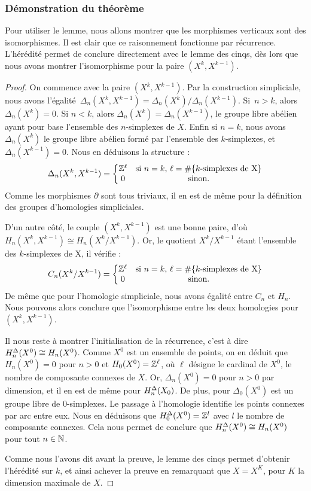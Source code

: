\subsubsection{Démonstration du théorème}
Pour utiliser le lemme, nous allons montrer que les morphismes verticaux sont des isomorphismes. Il est clair que ce raisonnement fonctionne par récurrence. L'hérédité permet de conclure directement avec le lemme des cinqs, dès lors que nous avons montrer l'isomorphisme pour la paire $(X^k, X^{k-1})$.
\begin{proof}
On commence avec la paire $(X^k, X^{k-1})$. Par la construction simpliciale, nous avons l'égalité~$\Delta_n(X^k,X^{k-1})=\Delta_n(X^k)/\Delta_n(X^{k-1})$. Si~$n>k$, alors $\Delta_n(X^k)=0$. Si $n<k$, alors $\Delta_n(X^k)=\Delta_n(X^{k-1})$, le groupe libre abélien ayant pour base l'ensemble des $n$-simplexes de $X$. Enfin si $n=k$, nous avons $\Delta_n(X^k)$ le groupe libre abélien formé par l'ensemble des $k$-simplexes, et $\Delta_n(X^{k-1})=0$. Nous en déduisons la structure : \[\Delta_n(X^k,X^{k-1})= \left\{\begin{matrix}
\mathbb{Z}^\ell & \text{si $n=k$, $\ell=\#\{k$-simplexes de X$\}$}\\
0 & \text{sinon}. \\
\end{matrix}\right.\]Comme les morphismes $\partial$ sont tous triviaux, il en est de même pour la définition des groupes d'homologies simpliciales.

D'un autre côté, le couple $(X^k,X^{k-1})$ est une bonne paire, d'où ${H_n(X^k,X^{k-1})\cong H_n(X^k/X^{k-1})}$. Or, le quotient $X^k/X^{k-1}$ étant l'ensemble des $k$-simplexes de X, il vérifie : \[C_n(X^k/X^{k-1})=\left\{\begin{matrix}
\mathbb{Z}^\ell & \text{si $n=k$, $\ell=\#\{k$-simplexes de X$\}$}\\
0&\text{sinon.}
\end{matrix}\right.\]De même que pour l'homologie simpliciale, nous avons égalité entre $C_n$ et $H_n$. Nous pouvons alors conclure que l'isomorphisme entre les deux homologies pour $(X^k,X^{k-1})$.

\bigskip Il nous reste à montrer l'initialisation de la récurrence, c'est à dire $H^\Delta_n(X^0)\cong H_n(X^0)$. Comme $X^0$ est un ensemble de points, on en déduit que $H_n(X^0)=0$ pour $n>0$ et $H_0(X^0)=\mathbb{Z}^\ell$, où $\ell$ désigne le cardinal de $X^0$, le nombre de composante connexes de $X$. Or, $\Delta_n(X^0)=0$ pour $n>0$ par dimension, et il en est de même pour $H^\Delta_n(X_0)$. De plus, pour $\Delta_0(X^0)$ est un groupe libre de 0-simplexes. Le passage à l'homologie identifie les points connexes par arc entre eux. Nous en déduisons que $H^\Delta_0(X^0)=\mathbb{Z}^l$ avec $l$ le nombre de composante connexes. Cela nous permet de conclure que $H^\Delta_n(X^0)\cong H_n(X^0)$ pour tout $n\in\mathbb{N}$.

\bigskip Comme nous l'avons dit avant la preuve, le lemme des cinqs permet d'obtenir l'hérédité sur $k$, et ainsi achever la preuve en remarquant que $X=X^K$, pour $K$ la dimension maximale de $X$.
\end{proof}

